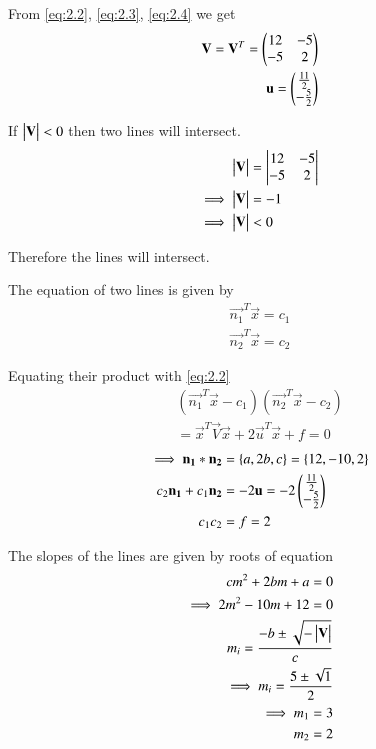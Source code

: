\documentclass[journal,12pt,twocolumn]{IEEEtran}
\begin{document}
From \eqref{eq:2.2}, \eqref{eq:2.3}, \eqref{eq:2.4} we get
\begin{align}
    \mathbf{V}=\mathbf{V}^T=\begin{pmatrix}12 & -5 \\ -5 & 2\end{pmatrix}\label{eq:2.17}\\
    \mathbf{u}=\begin{pmatrix}\frac{11}{2} \\ -\frac{5}{2}\end{pmatrix}\label{eq:2.18}
\end{align}

If $\begin{vmatrix}\mathbf{V}\end{vmatrix}<0$ then two lines will intersect.
\begin{align}
    \begin{vmatrix}\mathbf{V}\end{vmatrix}&=\begin{vmatrix}12 & -5 \\ -5 & 2\end{vmatrix}\\
    \implies\begin{vmatrix}\mathbf{V}\end{vmatrix}&=-1\\
    \implies\begin{vmatrix}\mathbf{V}\end{vmatrix}&<0
\end{align}

Therefore the lines will intersect.

The equation of two lines is given by
\begin{align}
    \vec{n_1}^T\vec{x}=c_1\label{eq:2.22}\\
    \vec{n_2}^T\vec{x}=c_2\label{eq:2.23}
\end{align}

Equating their product with \eqref{eq:2.2}
\begin{multline}
    (\vec{n_1}^T\vec{x}-c_1)(\vec{n_2}^T\vec{x}-c_2)\\=\vec{x}^T\vec{V}\vec{x}+2\vec{u}^T\vec{x}+f=0
\end{multline}
\begin{align}
    \implies\mathbf{n_1}*\mathbf{n_2}&=\{a,2b,c\}=\{12,-10,2\}\label{eq:conv}\\
    c_2\mathbf{n_1}+c_1\mathbf{n_2}&=-2\mathbf{u}=-2\begin{pmatrix}\frac{11}{2} \\ -\frac{5}{2}\end{pmatrix}\label{eq:2.26}\\
    c_1c_2&=f=2
\end{align}

The slopes of the lines are given by roots of equation
\begin{align}
    cm^2+2bm+a=0\label{eq:poly}\\
    \implies 2m^2-10m+12=0\\
    m_i=\frac{-b\pm{\sqrt{-\ensuremath{\begin{vmatrix}\mathbf{V}\end{vmatrix}}}}}{c}\\
    \implies m_i=\frac{5\pm{\sqrt{1}}}{2}\\
    \implies m_1=3\\
     m_2=2
\end{align}
\end{document}
